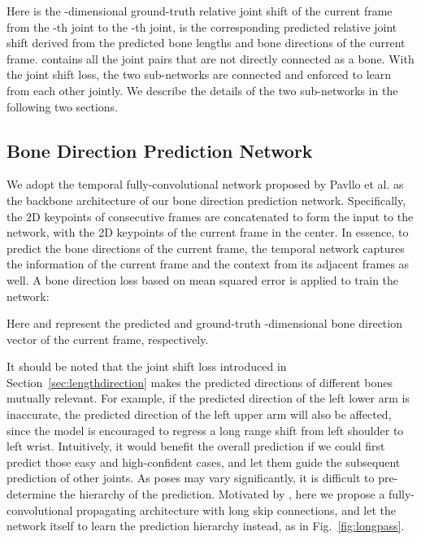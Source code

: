 \documentclass[journal]{IEEEtran}
\begin{document}
Here  is the -dimensional ground-truth relative joint shift of the current frame from the -th joint to the -th joint,  is the corresponding predicted relative joint shift derived from the predicted bone lengths and bone directions of the current frame.  contains all the joint pairs that are not directly connected as a bone. With the joint shift loss, the two sub-networks are connected and enforced to learn from each other jointly. We describe the details of the two sub-networks in the following two sections.

\subsection{Bone Direction Prediction Network} \label{sec:longpass}
We adopt the temporal fully-convolutional network proposed by Pavllo et al. \cite{pavllo20193d} as the backbone architecture of our bone direction prediction network. Specifically, the 2D keypoints of  consecutive frames are concatenated to form the input to the network, with the 2D keypoints of the current frame in the center. In essence, to predict the bone directions of the current frame, the temporal network captures the information of the current frame and the context from its adjacent frames as well. A bone direction loss based on mean squared error is applied to train the network:  
\vspace{-1mm}

Here  and  represent the predicted and ground-truth -dimensional bone direction vector of the current frame, respectively.

It should be noted that the joint shift loss introduced in Section~\ref{sec:lengthdirection} makes the predicted directions of different bones mutually relevant. For example, if the predicted direction of the left lower arm is inaccurate, the predicted direction of the left upper arm will also be affected, since the model is encouraged to regress a long range shift from left shoulder to left wrist. Intuitively, it would benefit the overall prediction if we could first predict those easy and high-confident cases, and let them guide the subsequent prediction of other joints. As poses may vary significantly, it is difficult to pre-determine the hierarchy of the prediction. Motivated by \cite{lee2018propagating}, here we propose a fully-convolutional propagating architecture with long skip connections, and let the network itself to learn the prediction hierarchy instead, as in Fig.~\ref{fig:longpass}.
\end{document}
